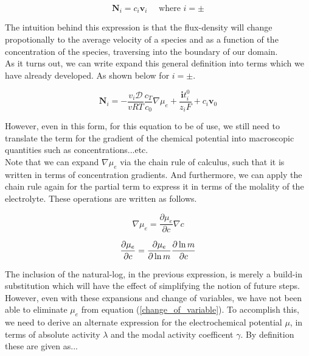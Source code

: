 \documentclass[lettersize,journal]{IEEEtran}
\begin{document}
\begin{equation}
  \textbf{N}_i = c_{i} \textbf{v}_i \quad \text{    where } i = \pm
\end{equation}

The intuition behind this expression is that the flux-density will change propotionally to the average velocity of a species and as a function of the concentration of the species, traversing into the boundary of our domain. \\

As it turns out, we can write expand this general definition into terms which we have already developed. As shown below for $i = \pm$.

\begin{equation}\label{flux_density}
    \mathbf{N}_{i} ={-\frac{v_{i} \mathscr{D}}{v R T} \frac{c_{T}}{c_{0}}} {\nabla \mu_{e}}+{\frac{\mathbf{i} t_{i}^{0}}{z_{i} F}}+{c_{i} \mathbf{v}_{0}}
\end{equation}

However, even in this form, for this equation to be of use, we still need to translate the term for the gradient of the chemical potential into macroscopic quantities such as concentrations...etc. \\

Note that we can expand $\nabla \mu_e$ via the chain rule of calculus, such that it is written in terms of concentration gradients. And furthermore, we can apply the chain rule again for the partial term to express it in terms of the molality of the electrolyte. These operations are written as follows.

\begin{equation}
  \nabla \mu_e = \frac{\partial{\mu_e}}{\partial{c}} \nabla c
\end{equation}

\begin{equation}\label{change_of_variable}
\frac{\partial \mu_{e}}{\partial c}=\frac{\partial \mu_{e}}{\partial \ln m} \frac{\partial \ln m}{\partial c} \\
\end{equation}

The inclusion of the natural-log, in the previous expression, is merely a build-in substitution which will have the effect of simplifying the notion of future steps. \\

However, even with these expansions and change of variables, we have not been able to eliminate ${\mu_e}$ from equation (\ref{change_of_variable}). To accomplish this, we need to derive an alternate expression for the electrochemical potential $\mu$, in terms of absolute activity $\lambda$ and the modal activity coefficent $\gamma$. By definition these are given as...
\end{document}
